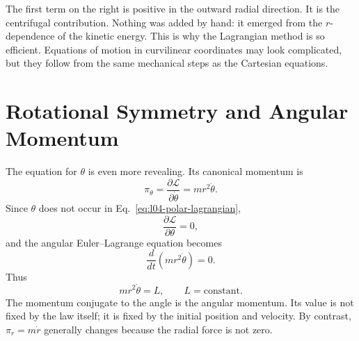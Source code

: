 The first term on the right is positive in the outward radial direction. It
is the centrifugal contribution. Nothing was added by hand: it emerged from
the \(r\)-dependence of the kinetic energy. This is why the Lagrangian method
is so efficient. Equations of motion in curvilinear coordinates may look
complicated, but they follow from the same mechanical steps as the Cartesian
equations.

\begin{classroomqa}
\end{classroomqa}

\section{Rotational Symmetry and Angular Momentum}

The equation for \(\theta\) is even more revealing. Its canonical momentum is
\begin{equation}
 \pi_\theta
 =\frac{\partial\mathcal L}{\partial\dot\theta}
 =mr^2\dot\theta.
 \label{eq:l04-angular-momentum}
\end{equation}
Since \(\theta\) does not occur in Eq.~\eqref{eq:l04-polar-lagrangian},
\begin{equation}
 \frac{\partial\mathcal L}{\partial\theta}=0,
\end{equation}
and the angular Euler--Lagrange equation becomes
\begin{equation}
 \frac{d}{dt}\left(mr^2\dot\theta\right)=0.
\end{equation}
Thus
\begin{equation}
 mr^2\dot\theta=L,
 \qquad L=\text{constant}.
 \label{eq:l04-L-constant}
\end{equation}
The momentum conjugate to the angle is the angular momentum. Its value is not
fixed by the law itself; it is fixed by the initial position and velocity. By
contrast, \(\pi_r=m\dot r\) generally changes because the radial force is not
zero.

